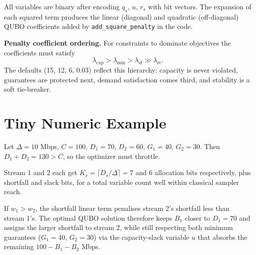 \documentclass[11pt,a4paper]{article}
\begin{document}
\noindent All variables are binary after encoding $q_s$, $u$, $r_s$ with bit vectors.
The expansion of each squared term produces the linear (diagonal) and quadratic
(off-diagonal) QUBO coefficients added by \texttt{add\_square\_penalty} in the
code.

\bigskip
\noindent\textbf{Penalty coefficient ordering.} For constraints to dominate
objectives the coefficients must satisfy
\[
\lambda_{\text{cap}} > \lambda_{\text{min}} > \lambda_{\text{sf}} \gg \lambda_{\text{st}}.
\]
The defaults (15, 12, 6, 0.03) reflect this hierarchy: capacity is never
violated, guarantees are protected next, demand satisfaction comes third, and
stability is a soft tie-breaker.

\section*{Tiny Numeric Example}

Let $\Delta=10$ Mbps, $C=100$, $D_1=70$, $D_2=60$, $G_1=40$, $G_2=30$.
Then $D_1+D_2=130>C$, so the optimizer must throttle.

Stream 1 and 2 each get $K_s = \lceil D_s/\Delta \rceil = 7$ and $6$ allocation
bits respectively, plus shortfall and slack bits, for a total variable count
well within classical sampler reach.

If $w_1 > w_2$, the shortfall linear term penalises stream 2's shortfall less
than stream 1's.  The optimal QUBO solution therefore keeps $B_1$ closer to
$D_1 = 70$ and assigns the larger shortfall to stream 2, while still respecting
both minimum guarantees ($G_1=40$, $G_2=30$) via the capacity-slack variable
$u$ that absorbs the remaining $100 - B_1 - B_2$ Mbps.
\end{document}
